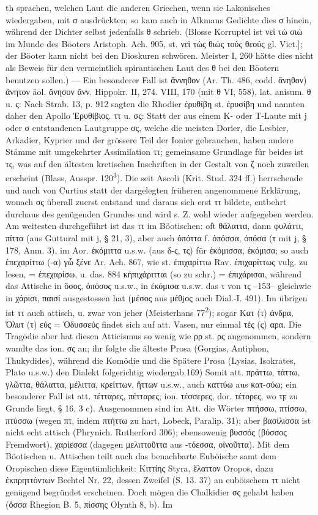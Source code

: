 th sprachen, welchen Laut die anderen Griechen, wenn sie Lakonisches wiedergaben, mit σ ausdrückten; so kam auch in Alkmans Gedichte dies σ hinein, während der Dichter selbst jedenfalls θ schrieb. (Blosse Korruptel ist νεὶ τὼ σιώ im Munde des Böoters Aristoph. Ach. 905, st. νεὶ τὼς θιώς τοὺς θεούς gl. Vict.]; der Böoter kann nicht bei den Dioskuren schwören. Meister I, 260 hätte dies nicht als Beweis für den vermeintlich spirantischen Laut des θ bei den Böotern benutzen sollen.) — Ein besonderer Fall ist ἄννηθον (Ar. Th. 486, codd. ἄνηθον) ἄνητον äol. ἄνησον ἄνν. Hippokr. II, 274. VIII, 170 (mit θ VI, 558), lat. anisum. θ u. ς: Nach Strab. 13, p. 912 sagten die Rhodier ἐρυθίβη st. ἐρυσίβη und nannten daher den Apollo Ἐρυθίβιος. ττ u. σς: Statt der aus einem K- oder T-Laute mit j oder σ entstandenen Lautgruppe σς, welche die meisten Dorier, die Lesbier, Arkadier, Kyprier und der grössere Teil der Ionier gebrauchen, haben andere Stämme mit umgekehrter Assimilation ττ; gemeinsame Grundlage für beides ist τς, was auf den ältesten kretischen Inschriften in der Gestalt von ζ noch zuweilen erscheint (Blass, Ausspr. 120\textsuperscript{3}). Die seit Ascoli (Krit. Stud. 324 ff.) herrschende und auch von Curtius statt der dargelegten früheren angenommene Erklärung, wonach σς überall zuerst entstand und daraus sich erst ττ bildete, entbehrt durchaus des genügenden Grundes und wird s. Z. wohl wieder aufgegeben werden. Am weitesten durchgeführt ist das ττ im Böotischen: oft θάλαττα, dann φυλάττι, πίττα (aus Guttural mit j, § 21, 3), aber auch ὁπόττα f. ὁπόσσα, ὁπόσα (τ mit j, § 178, Anm. 3), im Aor. ἐκόμιττα u.s.w. (aus δ-ς, τς) für ἐκόμισσα, ἐκόμισα; so auch ἐπεχαρίττω (-α) γὦ ξένε Ar. Ach. 867, wie st. ἐπιχαρίττω Rav. ἐπιχαρίττως vulg. zu lesen, = ἐπεχαρίσω, u. das. 884 κἠπιχάριτται (so zu schr.) = ἐπιχάρισαι, während das Attische in ὅσος, ὁπόσος u.s.w., in ἐκόμισα u.s.w. das τ von τς --153-- gleichwie in χάρισι, παισί ausgestossen hat (μέσος aus μέθjος auch  Dial.-I. 491). Im übrigen ist ττ auch attisch, u. zwar von jeher (Meisterhans 77\textsuperscript{2}); sogar Κατ (τ) άνδρα, Ὀλυτ (τ) εύς = Ὀδυσσεύς findet sich auf att. Vasen, nur einmal τές (ς) αρα. Die Tragödie aber hat diesen Atticismus so wenig wie ρρ st. ρς angenommen, sondern wandte das ion. σς an; ihr folgte die älteste Prosa (Gorgias, Antiphon, Thukydides), während die Komödie und die Spätere Prosa (Lysias, Isokrates, Plato u.s.w.) den Dialekt folgerichtig wiedergab.169) Somit att. πράττω, τάττω, γλῶττα, θάλαττα, μέλιττα, κρείττων, ἥττων u.s.w., auch καττύω aus κατ-σύω; ein besonderer Fall ist att. τέτταρες,  πέτταρες, ion. τέσσερες, dor. τέτορες, wo τϝ zu Grunde liegt, § 16, 3 c). Ausgenommen sind im Att. die Wörter πτήσσω, πτίσσω, πτύσσω (wegen πτ, indem πτήττω zu hart, Lobeck, Paralip. 31); aber βασίλισσα ist nicht echt attisch (Phrynich. Rutherford 306); ebensowenig βυσσός (βύσσος Fremdwort), χαρίεσσα (dagegen μελιττοῦττα aus -τόεσσα, οἰνοῦττα). Mit dem Böotischen u. Attischen teilt auch das benachbarte Euböische samt dem Oropischen diese Eigentümlichkeit: Κιττίης Styra, ἔλαττον Oropos, dazu ἐκπρηττόντων Bechtel Nr. 22, dessen Zweifel (S. 13. 37) an euböischem ττ nicht genügend begründet erscheinen. Doch mögen die Chalkidier σς gehabt haben (ὅσσα Rhegion B. 5, πίσσης Olynth 8, b). Im 